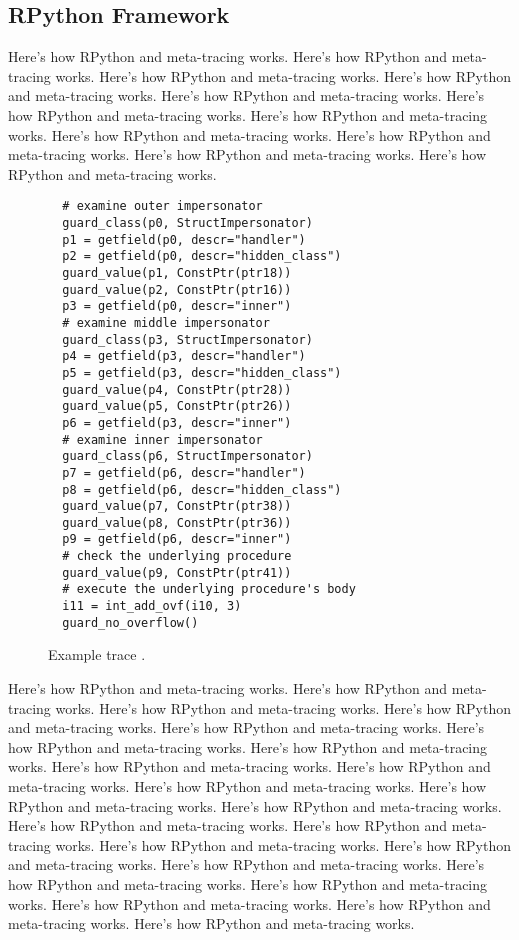 \subsection{RPython Framework}
\label{subsec:rpython}

Here's how RPython and meta-tracing works. Here's how RPython and meta-tracing works. Here's how RPython and meta-tracing works. Here's how RPython and meta-tracing works. Here's how RPython and meta-tracing works. Here's how RPython and meta-tracing works. Here's how RPython and meta-tracing works. Here's how RPython and meta-tracing works. Here's how RPython and meta-tracing works. Here's how RPython and meta-tracing works. Here's how RPython and meta-tracing works.

  \begin{wrapfigure}{r}{0.35\textwidth}
    \centering
    \begin{minipage}[t]{0.32\textwidth}
    \begin{verbatim}
  # examine outer impersonator
  guard_class(p0, StructImpersonator)
  p1 = getfield(p0, descr="handler")
  p2 = getfield(p0, descr="hidden_class")
  guard_value(p1, ConstPtr(ptr18))
  guard_value(p2, ConstPtr(ptr16))
  p3 = getfield(p0, descr="inner")
  # examine middle impersonator
  guard_class(p3, StructImpersonator)
  p4 = getfield(p3, descr="handler")
  p5 = getfield(p3, descr="hidden_class")
  guard_value(p4, ConstPtr(ptr28))
  guard_value(p5, ConstPtr(ptr26))
  p6 = getfield(p3, descr="inner")
  # examine inner impersonator
  guard_class(p6, StructImpersonator)
  p7 = getfield(p6, descr="handler")
  p8 = getfield(p6, descr="hidden_class")
  guard_value(p7, ConstPtr(ptr38))
  guard_value(p8, ConstPtr(ptr36))
  p9 = getfield(p6, descr="inner")
  # check the underlying procedure
  guard_value(p9, ConstPtr(ptr41))
  # execute the underlying procedure's body
  i11 = int_add_ovf(i10, 3)
  guard_no_overflow()
    \end{verbatim}
    \end{minipage}
    \caption{\small Example trace .}
    \label{fig:trace}
  \end{wrapfigure}

Here's how RPython and meta-tracing works. Here's how RPython and meta-tracing works. Here's how RPython and meta-tracing works. Here's how RPython and meta-tracing works. Here's how RPython and meta-tracing works. Here's how RPython and meta-tracing works. Here's how RPython and meta-tracing works. Here's how RPython and meta-tracing works. Here's how RPython and meta-tracing works. Here's how RPython and meta-tracing works. Here's how RPython and meta-tracing works. Here's how RPython and meta-tracing works. Here's how RPython and meta-tracing works. Here's how RPython and meta-tracing works. Here's how RPython and meta-tracing works. Here's how RPython and meta-tracing works. Here's how RPython and meta-tracing works. Here's how RPython and meta-tracing works. Here's how RPython and meta-tracing works. Here's how RPython and meta-tracing works. Here's how RPython and meta-tracing works. Here's how RPython and meta-tracing works.

